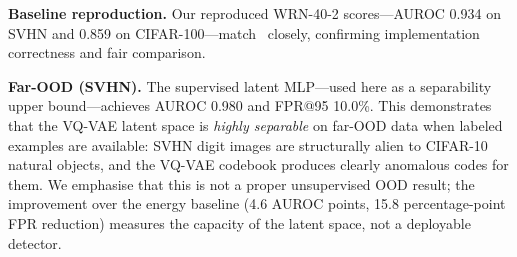 \documentclass[10pt,twocolumn,letterpaper]{article}
\begin{document}
\begin{table}[!ht]
\caption{OOD detection with CIFAR-10 as in-distribution.
  $\uparrow$\,higher is better; $\downarrow$\,lower.
  \textbf{Bold} = best per column.
  $\dagger$\,Supervised Latent MLP uses test-OOD labels
  (data leakage)---upper bound only; see
  Section~\ref{sec:method}.}
\label{tab:results}
\centering
{}
\end{table}

\textbf{Baseline reproduction.}
Our reproduced WRN-40-2 scores---AUROC 0.934 on SVHN and
0.859 on CIFAR-100---match~\cite{liu2020} closely,
confirming implementation correctness and fair comparison.

\textbf{Far-OOD (SVHN).}
The supervised latent MLP---used here as a separability
upper bound---achieves AUROC 0.980 and FPR@95 10.0\%.
This demonstrates that the VQ-VAE latent space is
\emph{highly separable} on far-OOD data when labeled
examples are available: SVHN digit images are structurally
alien to CIFAR-10 natural objects, and the VQ-VAE codebook
produces clearly anomalous codes for them.
We emphasise that this is not a proper unsupervised OOD
result; the improvement over the energy baseline
(4.6 AUROC points, 15.8 percentage-point FPR reduction)
measures the capacity of the latent space, not a
deployable detector.
\end{document}
